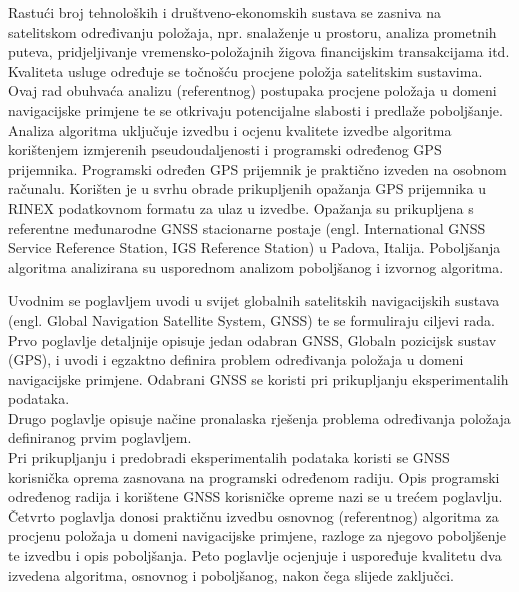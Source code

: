 \documentclass[a4paper,twoside,12pt]{memoir} %
\begin{document}


\pagestyle{empty} %

\begin{sazetak}
Rastući broj tehnoloških i društveno-ekonomskih sustava se zasniva na satelitskom 
određivanju položaja, npr. snalaženje u prostoru, 
 analiza prometnih puteva, pridjeljivanje vremensko-položajnih žigova financijskim transakcijama itd.
Kvaliteta usluge određuje se točnošću procjene položja
satelitskim sustavima.\\
Ovaj rad obuhvaća analizu (referentnog) postupaka procjene položaja u domeni navigacijske primjene te
se otkrivaju potencijalne slabosti i predlaže poboljšanje.
Analiza algoritma uključuje izvedbu i ocjenu kvalitete izvedbe algoritma korištenjem izmjerenih pseudoudaljenosti i programski određenog GPS prijemnika.
Programski određen GPS prijemnik je praktično izveden na osobnom računalu. Korišten je u svrhu obrade prikupljenih opažanja GPS prijemnika u RINEX podatkovnom formatu za ulaz u izvedbe.
Opažanja su prikupljena s referentne međunarodne GNSS stacionarne postaje (engl. International GNSS Service Reference Station, IGS Reference Station) u  Padova, Italija.
Poboljšanja algoritma analizirana su usporednom analizom poboljšanog i izvornog algoritma.
\vspace{0.5cm}

Uvodnim se poglavljem uvodi u svijet globalnih satelitskih navigacijskih sustava (engl. Global Navigation Satellite System, GNSS) te se formuliraju ciljevi rada. Prvo poglavlje detaljnije opisuje jedan odabran GNSS, Globaln pozicijsk sustav (GPS), i uvodi i egzaktno definira problem određivanja položaja u domeni navigacijske primjene. Odabrani GNSS se koristi pri prikupljanju eksperimentalih podataka. \\
Drugo poglavlje opisuje načine pronalaska rješenja problema određivanja položaja definiranog prvim poglavljem.\\
Pri prikupljanju i predobradi eksperimentalih podataka koristi se GNSS korisnička oprema zasnovana na programski određenom radiju.
Opis programski određenog radija i korištene GNSS korisničke opreme nazi se u trećem poglavlju.
Četvrto poglavlja donosi praktičnu izvedbu osnovnog (referentnog) algoritma za procjenu položaja u domeni navigacijske primjene, razloge za njegovo poboljšenje te izvedbu i opis poboljšanja.
Peto poglavlje ocjenjuje i uspoređuje kvalitetu dva izvedena algoritma, osnovnog i poboljšanog, nakon čega slijede zaključci.
\end{sazetak}
\end{document}
